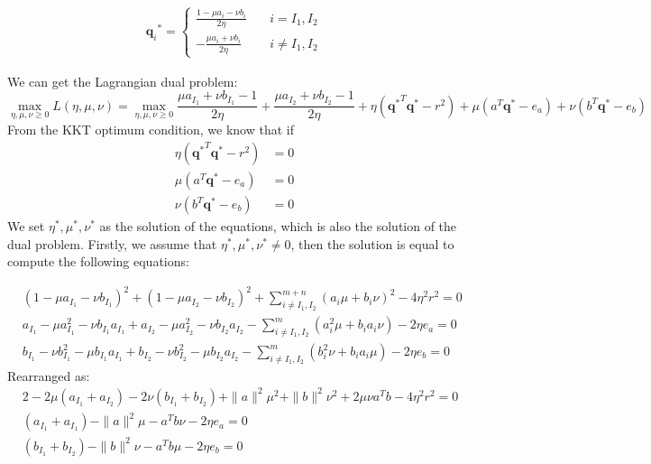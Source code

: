 \documentclass[twoside]{article}
\theoremstyle{plain}
\renewcommand{\vec}[1]{\bm{#1}}
\begin{document}
 \begin{equation}
\begin{split} 
{\vec{q}_i}^{*} = \left\{
\begin{aligned}
\frac{1- \mu a_i - \nu b_i}{2\eta} \quad& i = I_1, I_2\\
-\frac{\mu a_i + \nu b_i}{2\eta} \quad& i \neq I_1, I_2
\end{aligned}
\right.
 \end{split}
\label{eq:lang1}
\end{equation}

We can get the Lagrangian dual problem:
\begin{equation}
\max_{\eta,\mu,\nu\geq0} L(\eta,\mu,\nu) = \max_{\eta,\mu,\nu\geq0} \frac{\mu a_{I_1} + \nu b_{I_1}-1}{2\eta} +\frac{\mu a_{I_2} + \nu b_{I_2}-1}{2\eta}+ \eta({\vec{q}^{*}}^T\vec{q}^{*}-r^2 )+\mu( a^T\vec{q}^{*} - e_a ) + \nu( b^T\vec{q}^{*} - e_b )
\end{equation}
From the KKT optimum condition, we know that if
\begin{equation}
\begin{split} 
 \eta ({\vec{q}^{*}}^T\vec{q}^{*} -r^2) &= 0\\
 \mu( a^T\vec{q}^{*} - e_a)&= 0\\
 \nu(b^T\vec{q}^{*} - e_b) &=0
 \end{split}
\end{equation}
We set $\eta^{*}, \mu^{*}, \nu^{*}$ as the solution of the equations, which is also the solution of the dual problem. Firstly, we assume that $\eta^{*}, \mu^{*}, \nu^{*} \neq 0$, then the solution is equal to compute the following equations:

\begin{equation}
\begin{split} 
 & (1-\mu a_{I_1}-\nu b_{I_1})^2 + (1-\mu a_{I_2}-\nu b_{I_2})^2 + \sum^{m+n}_{i\neq I_1,I_2}(a_i\mu+b_i\nu)^2 - 4\eta^2 r^2 = 0 \\
 & a_{I_1}-\mu a_{I_1}^2-\nu b_{I_1}a_{I_1} + a_{I_2}-\mu a_{I_2}^2-\nu b_{I_2}a_{I_2} - \sum^{m}_{i\neq I_1,I_2}(a_i^2\mu +b_i a_i\nu) - 2\eta {e_a} = 0 \\
 & b_{I_1}-\nu b_{I_1}^2-\mu b_{I_1}a_{I_1} + b_{I_2}-\nu b_{I_2}^2-\mu b_{I_2}a_{I_2} - \sum^{m}_{i\neq I_1,I_2}(b_i^2\nu +b_i a_i\mu) - 2\eta {e_b} = 0 
 \end{split}
\end{equation}
Rearranged as:
\begin{equation}
\begin{split} 
 & 2-2\mu (a_{I_1}+a_{I_2})-2\nu(b_{I_1}+b_{I_2})+ \|a\|^2\mu^2+\|b\|^2\nu^2+2\mu\nu a^Tb - 4\eta^2 r^2 = 0 \\
 & (a_{I_1}+ a_{I_1}) - \|a\|^2\mu - a^Tb\nu - 2\eta {e_a} = 0 \\
 & (b_{I_1}+ b_{I_2}) - \|b\|^2\nu - a^Tb \mu - 2\eta {e_b} = 0 
 \end{split}
\end{equation}
\end{document}
